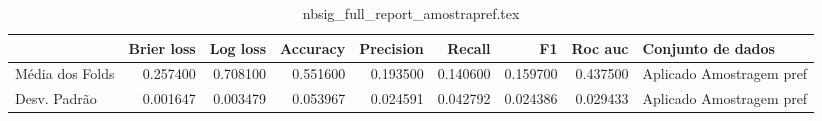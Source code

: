 \begin{table}
\centering
\caption{nbsig_full_report_amostrapref.tex}
\label{nbsig_full_report_amostrapref.tex}
\begin{tabular}{lrrrrrrrl}
\toprule
{} &  Brier  loss &  Log loss &  Accuracy  &  Precision  &   Recall  &       F1  &  Roc auc  &         Conjunto de dados \\
\midrule
Média dos Folds &     0.257400 &  0.708100 &   0.551600 &    0.193500 &  0.140600 &  0.159700 &  0.437500 &  Aplicado Amostragem pref \\
Desv. Padrão    &     0.001647 &  0.003479 &   0.053967 &    0.024591 &  0.042792 &  0.024386 &  0.029433 &  Aplicado Amostragem pref \\
\bottomrule
\end{tabular}
\end{table}
